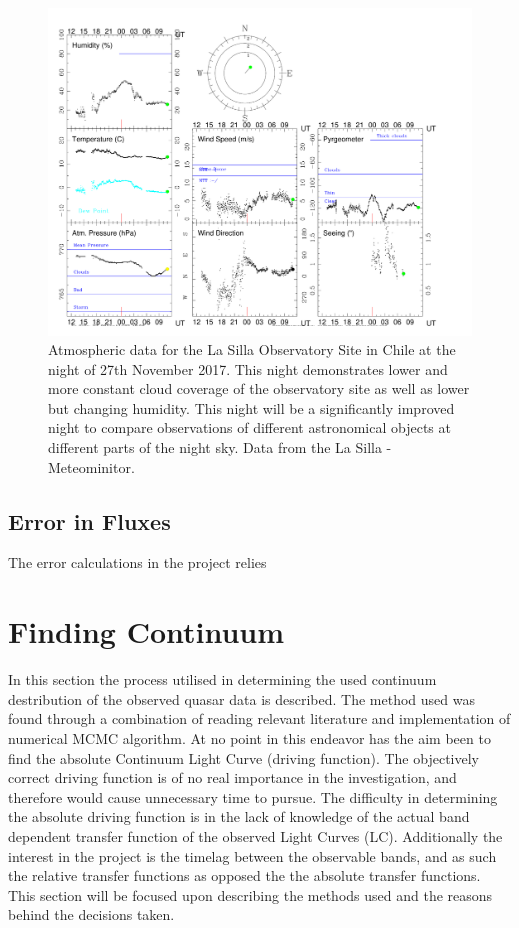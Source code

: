 \documentclass[a4paper, 12pt, twoside]{article}
\begin{document}
\begin{figure}[htp!]
\includegraphics[width=1.1\linewidth]{Figure/end171127.pdf}
\caption{Atmospheric data for the La Silla Observatory Site in Chile at the night of 27th November 2017. This night demonstrates lower and more constant cloud coverage of the observatory site as well as lower but changing humidity. This night will be a significantly improved night to compare observations of different astronomical objects at different parts of the night sky. Data from the La Silla - Meteominitor.}
\label{fig:good_night}
\end{figure}

\subsection{Error in Fluxes}
The error calculations in the project relies 

\section{Finding Continuum}
In this section the process utilised in determining the used continuum destribution of the observed quasar data is described. The method used was found through a combination of reading relevant literature and implementation of numerical MCMC algorithm. At no point in this endeavor has the aim been to find the absolute Continuum Light Curve (driving function). The objectively correct driving function is of no real importance in the investigation, and therefore would cause unnecessary time to pursue. The difficulty in determining the absolute driving function is in the lack of knowledge of the actual band dependent transfer function of the observed Light Curves (LC). Additionally the interest in the project is the timelag between the observable bands, and as such the relative transfer functions as opposed the the absolute transfer functions. \\
This section will be focused upon describing the methods used and the reasons behind the decisions taken.\\
\end{document}
